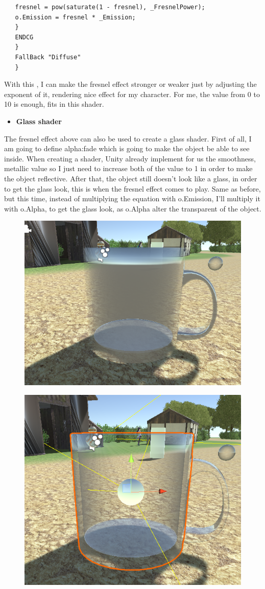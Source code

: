 \documentclass[a4paper, 13pt]{extarticle}
\begin{document}
{\begin{lstlisting}
   fresnel = pow(saturate(1 - fresnel), _FresnelPower);
   o.Emission = fresnel * _Emission;
   }
   ENDCG							  
   } 
   FallBack "Diffuse"
   }
   \end{lstlisting}
  With this , I can make the fresnel effect stronger or weaker just by adjusting the exponent of it, rendering nice effect for my character. For me, the value from 0 to 10 is enough, fits in this shader.
   \begin{itemize}
  	\item \bfseries Glass shader
  \end{itemize}  
  	The fresnel effect above can also be used to create a glass shader. First of all, I am going to define alpha:fade which is going to make the object be able to see inside. When creating a shader, Unity already implement for us the smoothness, metallic value so I just need to increase both of the value to 1 in order to make the object reflective. After that, the object still doesn't look like a glass, in order to get the glass look, this is when the fresnel effect comes to play. Same as before, but this time, instead of multiplying the equation with o.Emission, I'll multiply it with o.Alpha, to get the glass look, as o.Alpha alter the transparent of the object.
  	\begin{figure}[h]
  		\begin{minipage}{.5\textwidth}
  			\centering
  			\includegraphics[width=0.7\linewidth]{intructions/whole_surface.png}
  			\centering
  			\label{fig:test30}
  		\end{minipage}
  		\begin{minipage}{.5\textwidth}
  			\centering
  			\includegraphics[width=0.6\linewidth]{intructions/from_edge.png}
  			\centering
  			\label{fig:test31}
  		\end{minipage}
  		

\end{figure}}
\end{document}
